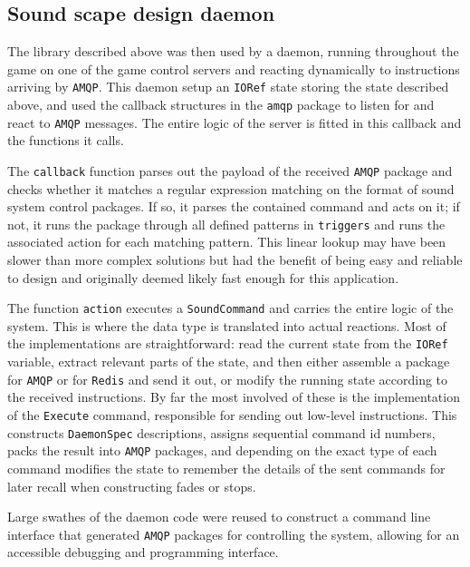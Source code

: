 \subsection{Sound scape design daemon}
\label{sec:sound-scape-design}

The library described above was then used by a daemon, running
throughout the game on one of the game control servers and reacting
dynamically to instructions arriving by \texttt{AMQP}. This daemon setup an
\texttt{IORef} state storing the state described above, and used the
callback structures in the \texttt{amqp} package to listen for and
react to \texttt{AMQP} messages. The entire logic of the server is fitted in
this callback and the functions it calls.

The \texttt{callback} function parses out the payload of the received \texttt{AMQP}
package and checks whether it matches a regular expression matching on
the format of sound system control packages. If so, it parses the contained command and acts on it; if not, it runs
the package through all defined patterns in \texttt{triggers} and runs
the associated action for each matching pattern. This linear lookup
may have been slower than more complex solutions but had the benefit
of being easy and reliable to design and originally deemed likely fast
enough for this application. 

The function \texttt{action} executes a \texttt{SoundCommand} and
carries the entire logic of the system. This is where the data type is
translated into actual reactions. Most of the implementations are
straightforward: read the current state from the \texttt{IORef}
variable, extract relevant parts of the state, and then either assemble a package for
\texttt{AMQP} or for \texttt{Redis} and send it out, or modify the running state
according to the received instructions. By far the most involved of
these is the implementation of the \texttt{Execute} command,
responsible for sending out low-level instructions. This constructs
\texttt{DaemonSpec} descriptions, assigns sequential command id
numbers, packs the result into \texttt{AMQP} packages, and depending on the
exact type of each command modifies the state to remember the details
of the sent commands for later recall when constructing fades or
stops.

Large swathes of the daemon code were reused to construct a command
line interface that generated \texttt{AMQP} packages for controlling the
system, allowing for an accessible debugging and programming interface.


